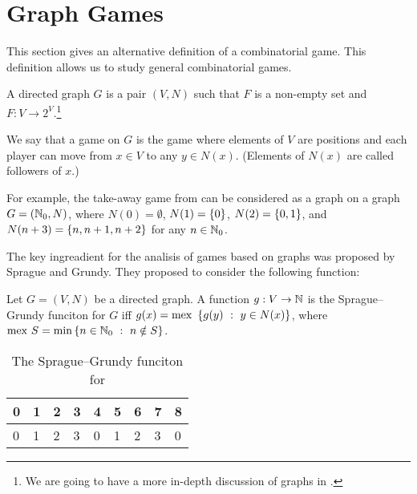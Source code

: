 \chapter{Graph Games}
This section gives an alternative definition of a combinatorial game.
This definition allows us to study general combinatorial games.
\begin{definition}
  A directed graph $G$ is a pair $(V, N)$ such that $F$ is a non-empty set and
  $F : V \to 2^V$.\footnote{We are going to have a more in-depth discussion
  of graphs in .}

  We say that a game on $G$ is the game where elements of $V$ are positions
  and each player can move from $x \in V$ to any $y \in N(x)$. (Elements of
  $N(x)$ are called followers of $x$.)
\end{definition}

For example, the take-away game from 
can be considered as a graph on a graph $G = (\mathbb{N}_0, N)$,
where $N(0) = \emptyset$, $N(1) = \set{0}$, $N(2) = \set{0, 1}$, and
$N(n + 3) = \set{n, n + 1, n + 2}$ for any $n \in \mathbb{N}_0$.

The key ingreadient for the analisis of games based on graphs was proposed
by Sprague and Grundy. They proposed to consider the following function:
\begin{definition}
  Let $G = (V, N)$ be a directed graph. A function $g : V \to \mathbb{N}$ is the
  Sprague--Grundy funciton for $G$ iff
  $g(x) = \mex\set[y \in N(x)]{g(y)}$, where
  $\mex S = \min \set[n \notin S]{n \in \N_0}$.
\end{definition}

\begin{table}[h!]
  \centering
  \begin{tabular}{l l l l l l l l l}
      \toprule
      0 & 1 & 2 & 3 & 4 & 5 & 6 & 7 & 8 \\
      \midrule
      0 & 1 & 2 & 3 & 0 & 1 & 2 & 3 & 0 \\
      \bottomrule
  \end{tabular}
  \caption{The Sprague--Grundy funciton for }
  \label{table:take-away-21-3-2-1-grundy}
\end{table}
